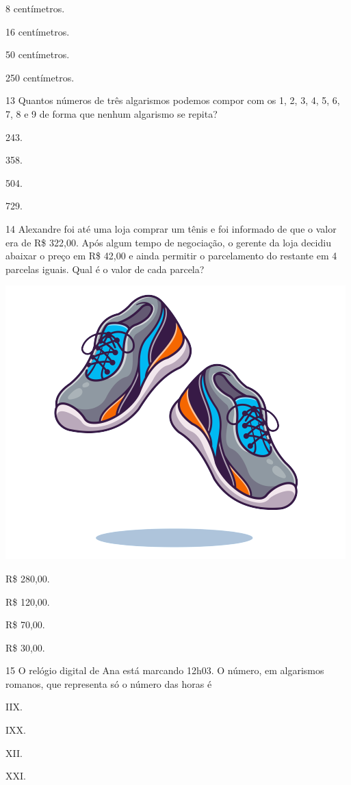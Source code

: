 \begin{escolha}
\item
  8 centímetros.
\item
  16 centímetros.
\item
  50 centímetros.
\item
  250 centímetros.
\end{escolha}


\num{13} Quantos números de três algarismos podemos compor com os 1, 2, 3, 4, 5, 6, 7, 8 e 9 de forma que nenhum algarismo se repita?

\begin{multicols}{2}
\begin{escolha}
\item
  243.
\item
  358.
\item
  504.
\item
  729.
\end{escolha}
\end{multicols}

\pagebreak
\num{14} Alexandre foi até uma loja comprar um tênis e foi informado de que o valor
era de R\$ 322,00. Após algum tempo de negociação, o gerente da loja decidiu
abaixar o preço em R\$ 42,00 e ainda permitir o parcelamento do restante em 4 parcelas iguais.
Qual é o valor de cada parcela?

\includegraphics[width=.8\textwidth]{media/image88c.png}

\begin{escolha}
\item
  R\$ 280,00.
\item
  R\$ 120,00.
\item
  R\$ 70,00.
\item
  R\$ 30,00.
\end{escolha}


\num{15} O relógio digital de Ana está marcando 12h03.
O número, em algarismos romanos, que representa só o número das horas é

\begin{escolha}
\item
  IIX.
\item
  IXX.
\item
  XII.
\item
  XXI.
\end{escolha}


